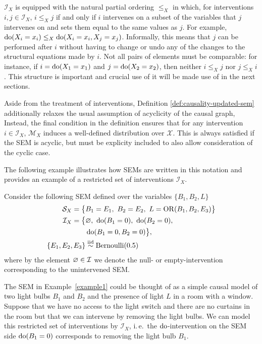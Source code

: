 $\mathcal{I}_X$ is equipped with the natural partial ordering $\leq_X$ in which, for interventions ${i, j \in \mathcal{I}_X}$, ${i\leq_X j}$ if and only if $i$ intervenes on a subset of the variables that $j$ intervenes on and sets them equal to the same values as $j$.
For example, ${\operatorname{do}(X_i=x_i) \leq_X \operatorname{do}(X_i=x_i, X_j=x_j)}$.
Informally, this means that $j$ can be performed after $i$ without having to change or undo any of the changes to the structural equations made by $i$.
Not all pairs of elements must be comparable: for instance, if $i= \operatorname{do}(X_1=x_1)$ and $j = \operatorname{do}(X_2=x_2)$, then neither $i\leq_X j$ nor $j \leq_X i$. 
This structure is important and crucial use of it will be made use of in the next sections.

Aside from the treatment of interventions, Definition \ref{def:causality-updated-sem} additionally relaxes the usual assumption of acyclicity of the causal graph, 
Instead, the final condition in the definition ensures that for any intervention ${i \in \mathcal{I}_X}$, $\mathcal{M}_X$ induces a well-defined distribution over $\mathcal{X}$. 
This is always satisfied if the SEM is acyclic, but must be explicity included to also allow consideration of the cyclic case.

The following example illustrates how SEMs are written in this notation and provides an example of a restricted set of interventions $\mathcal{I}_X$.

\medskip

\begin{example}\label{example1}
Consider the following SEM defined over the variables $\{ B_1,B_2,L \}$
%
\begin{align*}
\mathcal{S}_X = \big\{ & B_1 = E_1,\ B_2 = E_2,\ L = \operatorname{OR}(B_1,B_2,E_3) \big\} \\
%
\mathcal{I}_X = \big\{ & \nulli,\ \doop(B_1=0),\ \doop(B_2=0),\\
& \doop(B_1=0,B_2=0) \big\}, \\
%
\{ E_1,E_2,E_3 \} & \overset{\text{iid}}{\sim} \mathrm{Bernoulli}(0.5)
\end{align*}
%
where by the element $\varnothing \in \mathcal{I}$ we denote the null- or empty-intervention corresponding to the unintervened SEM\@.
\end{example}

The SEM in Example~\ref{example1} could be thought of as a simple causal model of two light bulbs $B_1$ and $B_2$ and the presence of light $L$ in a room with a window.
Suppose that we have no access to the light switch and there are no curtains in the room but that we can intervene by removing the light bulbs.
We can model this restricted set of interventions by $\mathcal{I}_X$, i.\,e.\ the $\operatorname{do}$-intervention on the SEM side ${\operatorname{do}(B_1=0)}$  corresponds to removing the light bulb $B_1$.

